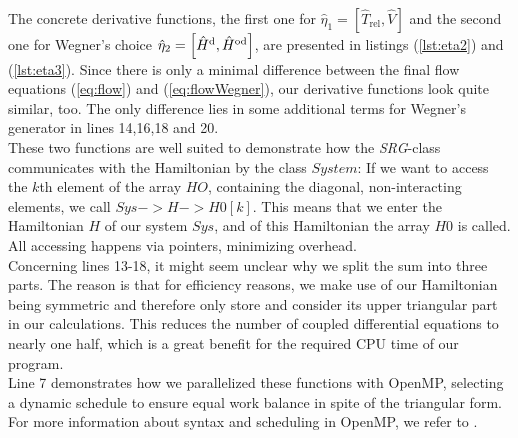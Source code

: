 The concrete derivative functions, the first one for  $\hat{\eta}_1 = \left[ \hat{T}_{\text{rel}}, \hat{V}\right]$  and the second one for Wegner's choice $\hat{\eta}_2 = \left[ \hat{H}^{\rm d}, \hat{H}^{\rm od} \right]$, are presented in listings (\ref{lst:eta2}) and (\ref{lst:eta3}). Since there is only a minimal difference between the final flow equations (\ref{eq:flow}) and (\ref{eq:flowWegner}), our derivative functions look quite similar, too. The only difference lies in some additional terms for Wegner's generator in lines 14,16,18 and 20. \\
These two functions are well suited to demonstrate how the \textit{SRG}-class communicates with the Hamiltonian by the class $System$: If we want to access the $k$th element of the array $HO$, containing the diagonal, non-interacting elements, we call $Sys->H->H0[k]$. This means that we enter the Hamiltonian $H$ of our system $Sys$, and of this Hamiltonian the array $H0$ is called. All accessing happens via pointers, minimizing overhead. \\
Concerning lines 13-18, it might seem unclear why we split the sum into three parts. The reason is that for efficiency reasons, we make use of our Hamiltonian being symmetric and therefore only store and consider its upper triangular part in our calculations. This reduces the number of coupled differential equations to nearly one half, which is a great benefit for the required CPU time of our program.\\
Line 7 demonstrates how we parallelized these functions with OpenMP, selecting a dynamic schedule to ensure equal work balance in spite of the triangular form. For more information about syntax and scheduling in OpenMP, we refer to \cite{quinn2004parallel}.


